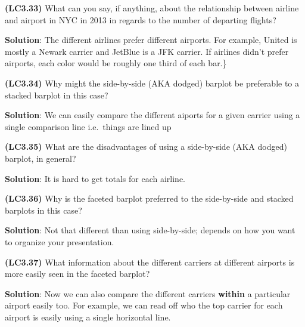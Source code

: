 \documentclass[12pt,]{krantz}
\theoremstyle{definition}
\theoremstyle{definition}
\theoremstyle{definition}
\theoremstyle{remark}
\begin{document}
\textbf{(LC3.33)} What can you say, if anything, about the relationship
between airline and airport in NYC in 2013 in regards to the number of
departing flights?

\textbf{Solution}: The different airlines prefer different airports. For
example, United is mostly a Newark carrier and JetBlue is a JFK carrier.
If airlines didn't prefer airports, each color would be roughly one
third of each bar.\}

\textbf{(LC3.34)} Why might the side-by-side (AKA dodged) barplot be
preferable to a stacked barplot in this case?

\textbf{Solution}: We can easily compare the different aiports for a
given carrier using a single comparison line i.e.~things are lined up

\textbf{(LC3.35)} What are the disadvantages of using a side-by-side
(AKA dodged) barplot, in general?

\textbf{Solution}: It is hard to get totals for each airline.

\textbf{(LC3.36)} Why is the faceted barplot preferred to the
side-by-side and stacked barplots in this case?

\textbf{Solution}: Not that different than using side-by-side; depends
on how you want to organize your presentation.

\textbf{(LC3.37)} What information about the different carriers at
different airports is more easily seen in the faceted barplot?

\textbf{Solution}: Now we can also compare the different carriers
\textbf{within} a particular airport easily too. For example, we can
read off who the top carrier for each airport is easily using a single
horizontal line.



\backmatter
\printindex
\end{document}
